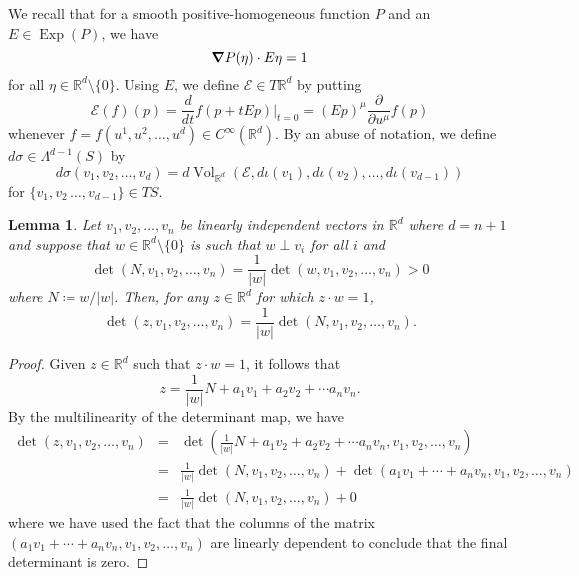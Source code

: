 \documentclass{article}
\newcommand\Exp{\operatorname{Exp}}
\renewcommand\det{\operatorname{det}}
\newcommand{\p}{\partial}
\newcommand{\R}{\mathbb{R}}
\newcommand{\f}[2]{\frac{#1}{#2}}
\newcommand{\lp}{\left(}
\newcommand{\rp}{\right)}
\theoremstyle{theorem}
\newtheorem{lemma}[theorem]{Lemma}
\newcommand{\Vol}{\operatorname{Vol}}
\begin{document}
\noindent We recall that for a smooth positive-homogeneous function $P$ and an $E\in \Exp(P)$, we have
\begin{equation*}
    \grad P(\eta) \cdot E\eta = 1
\end{equation*}
for all $\eta\in \R^d\setminus\{0\}$. Using $E$, we define $\mathcal{E}\in T\mathbb{R}^d$ by putting
\begin{equation*}
\mathcal{E}(f)(p)=\frac{d}{dt}f(p+tEp)\big\vert_{t=0}= (Ep)^\mu \f{\p}{\p u^\mu} f(p)
\end{equation*}
whenever $f=f(u^1,u^2,\dots,u^d)\in C^{\infty}(\mathbb{R}^d)$. By an abuse of notation, we define $d\sigma\in \Lambda^{d-1}(S)$ by
\begin{equation*}
d\sigma(v_1,v_2,\dots,v_d)=d\Vol_{\mathbb{R}^d}(\mathcal{E},d\iota(v_1),d\iota(v_2),\dots,d\iota(v_{d-1}))
\end{equation*}
for $\{v_1,v_2\,\dots,v_{d-1}\}\in TS$.

\begin{lemma}\label{prop:determinants}
Let $v_1,v_2,\dots,v_n$ be linearly independent vectors in $\mathbb{R}^d$ where $d=n+1$ and suppose that $w\in\mathbb{R}^d \setminus\{0\}$ is such that $w\perp v_i$ for all $i$ and 
\begin{equation*}
\det(N, v_1,v_2,\dots,v_n)=\frac{1}{|w|}\det(w,v_1,v_2,\dots,v_n)>0
\end{equation*}
where $N\coloneqq w/|w|$. Then, for any $z\in\mathbb{R}^d$ for which $z\cdot w=1$,
\begin{equation*}
\det(z, v_1,v_2,\dots,v_n)=\frac{1}{|w|}\det(N,v_1,v_2,\dots,v_n).
\end{equation*}
\end{lemma}

\begin{proof}
Given $z\in\mathbb{R}^d$ such that $z\cdot w=1$, it follows that 
\begin{equation*}
z=\frac{1}{|w|}N+a_1v_1+a_2v_2+\cdots a_nv_n.
\end{equation*}
By the multilinearity of the determinant map, we have
\begin{eqnarray*}
\det(z,v_1,v_2,\dots,v_n) &=&\det\lp \frac{1}{|w|}N+a_1v_2+a_2v_2+\cdots a_n v_n,v_1,v_2,\dots,v_n\rp\\
&=&\frac{1}{|w|}\det(N,v_1,v_2,\dots,v_n)+\det(a_1v_1+\cdots+a_n v_n, v_1,v_2,\dots,v_n)\\
&=&\frac{1}{|w|}\det(N, v_1,v_2,\dots,v_n)+0
\end{eqnarray*}
where we have used the fact that the columns of the matrix $(a_1v_1+\cdots+a_n v_n, v_1,v_2,\dots,v_n)$ are linearly dependent to conclude that the final determinant is zero.
\end{proof}
\end{document}
